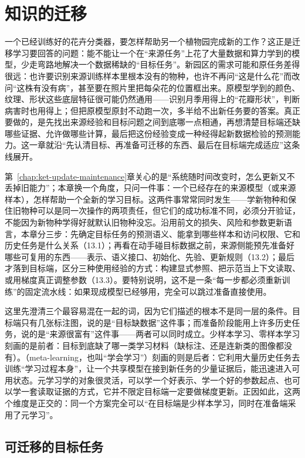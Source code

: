 \chapter{知识的迁移}
\label{chap:ket-transfer-adaptation}

一个已经训练好的花卉分类器，要怎样帮助另一个植物园完成新的工作？这正是迁移学习要回答的问题：能不能让一个在“来源任务”上花了大量数据和算力学到的模型，少走弯路地解决一个数据稀缺的“目标任务”。新园区的需求可能和原任务差得很远：也许要识别来源训练样本里根本没有的物种，也许不再问“这是什么花”而改问“这株有没有病”，甚至要在照片里把每朵花的位置框出来。原模型学到的颜色、纹理、形状这些底层特征很可能仍然通用——识别月季用得上的“花瓣形状”，判断病害时也用得上；但把原模型原封不动跑一次，多半给不出新任务要的答案。真正要做的，是先找出来源经验和目标问题之间到底哪一点相通，再想清楚目标端还缺哪些证据、允许做哪些计算，最后把这份经验变成一种经得起新数据检验的预测能力。这一章就沿“先认清目标、再准备可迁移的东西、最后在目标端完成适应”这条线展开。

第~\ref{chap:ket-update-maintenance}章关心的是“系统随时间改变时，怎么更新又不丢掉旧能力”；本章换一个角度，只问一件事：一个已经存在的来源模型（或来源样本），怎样帮助一个全新的学习目标。这两件事常常同时发生——学新物种和保住旧物种可以是同一次操作的两项责任，但它们的成功标准不同，必须分开验证，不能因为新物种学得好就默认旧物种没忘。沿用前文的损失、风险和参数更新语言，本章分三步：先确定目标任务的预测语义、能拿到哪些样本和访问权限、它和历史任务是什么关系（13.1）；再看在动手碰目标数据之前，来源侧能预先准备好哪些可复用的东西——表示、语义接口、初始化、先验、更新规则（13.2）；最后才落到目标端，区分三种使用经验的方式：构建显式参照、把示范当上下文读取、或用梯度真正调整参数（13.3）。要特别说明，这不是一条“每一步都必须重新训练”的固定流水线：如果现成模型已经够用，完全可以跳过准备直接使用。

这里先澄清三个最容易混在一起的词，因为它们描述的根本不是同一层的条件。目标端只有几张标注图，说的是“目标缺数据”这件事；而准备阶段能用上许多历史任务，说的是“来源很富有”这件事——两者可以同时成立。少样本学习、零样本学习刻画的是前者：目标到底缺了哪一类学习材料（缺标注、还是连新类的图像都没有）。（meta-learning，也叫“学会学习”）刻画的则是后者：它利用大量历史任务去训练“学习过程本身”，让一个共享模型在接到新任务的少量证据后，能迅速进入可用状态。元学习学的对象很灵活，可以学一个好表示、学一个好的参数起点、也可以学一套读取证据的方式，它并不限定目标端一定要做梯度更新。正因如此，这两个维度是正交的：同一个方案完全可以“在目标端是少样本学习，同时在准备端采用了元学习”。

\section{可迁移的目标任务}
\label{sec:ket-transfer-targets}

